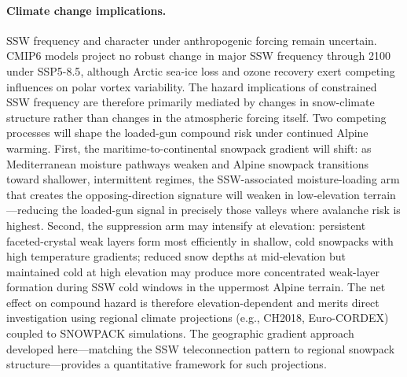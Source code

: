 \documentclass[11pt,letterpaper]{article}
\begin{document}
\paragraph{Climate change implications.} SSW frequency and character under anthropogenic forcing remain uncertain. CMIP6 models project no robust change in major SSW frequency through 2100 under SSP5-8.5\cite{Ayarzaguena2020}, although Arctic sea-ice loss and ozone recovery exert competing influences on polar vortex variability\cite{Kim2014,Baldwin2021}. The hazard implications of constrained SSW frequency are therefore primarily mediated by changes in snow-climate structure rather than changes in the atmospheric forcing itself. Two competing processes will shape the loaded-gun compound risk under continued Alpine warming. First, the maritime-to-continental snowpack gradient will shift: as Mediterranean moisture pathways weaken and Alpine snowpack transitions toward shallower, intermittent regimes, the SSW-associated moisture-loading arm that creates the opposing-direction signature will weaken in low-elevation terrain---reducing the loaded-gun signal in precisely those valleys where avalanche risk is highest. Second, the suppression arm may intensify at elevation: persistent faceted-crystal weak layers form most efficiently in shallow, cold snowpacks with high temperature gradients\cite{Schweizer2003}; reduced snow depths at mid-elevation but maintained cold at high elevation may produce more concentrated weak-layer formation during SSW cold windows in the uppermost Alpine terrain. The net effect on compound hazard is therefore elevation-dependent and merits direct investigation using regional climate projections (e.g., CH2018, Euro-CORDEX) coupled to SNOWPACK simulations. The geographic gradient approach developed here---matching the SSW teleconnection pattern to regional snowpack structure---provides a quantitative framework for such projections.
\end{document}
